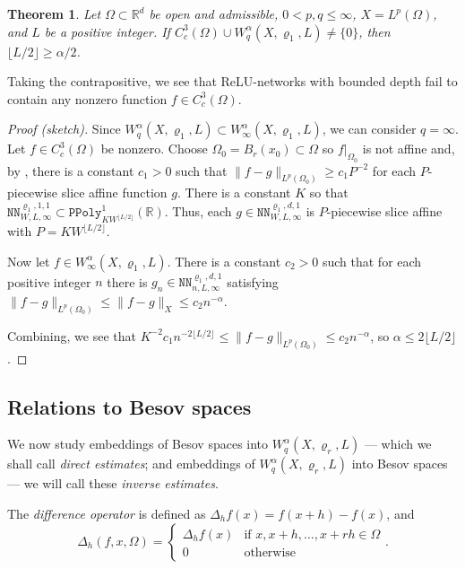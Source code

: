 \documentclass{article}
\newtheorem{theorem}{Theorem}[section]
\theoremstyle{definition}
\theoremstyle{remark}
\begin{document}
\begin{theorem}
    Let $\Omega \subset \mathbb{R}^d$ be open and admissible, $0 < p,q \leq \infty$, $X = L^p(\Omega)$, and $L$ be a positive integer. If $C_c^3(\Omega) \cup W_q^\alpha(X,\varrho_1,L) \neq \{ 0 \}$, then $\lfloor L/2 \rfloor \geq \alpha/2$.
\end{theorem}

Taking the contrapositive, we see that ReLU-networks with bounded depth fail to contain any nonzero function $f \in C_c^3(\Omega)$.

\begin{proof}[Proof (sketch)]
    Since $W_q^\alpha(X,\varrho_1,L) \subset W_\infty^\alpha(X,\varrho_1,L)$, we can consider $q = \infty$. Let $f \in C_c^3(\Omega)$ be nonzero. Choose $\Omega_0 = B_r(x_0) \subset \Omega$ so $f|_{\Omega_0}$ is not affine and, by \cite[Proposition C.5]{petersen_optimal_2018}, there is a constant $c_1 > 0$ such that $\lVert f-g \rVert_{L^p(\Omega_0)} \geq c_1P^{-2}$ for each $P$-piecewise slice affine function $g$. There is a constant $K$ so that $\mathtt{NN}_{W,L,\infty}^{\varrho_1,1,1} \subset \mathtt{PPoly}_{KW^{\lfloor L/2 \rfloor}}^1(\mathbb{R})$. Thus, each $g \in\mathtt{NN}_{W,L,\infty}^{\varrho_1,d,1}$ is $P$-piecewise slice affine with $P = KW^{\lfloor L/2 \rfloor}$.

    Now let $f \in W_\infty^\alpha(X,\varrho_1,L)$. There is a constant $c_2 > 0$ such that for each positive integer $n$ there is $g_n \in \mathtt{NN}_{n,L,\infty}^{\varrho_1,d,1}$ satisfying $\lVert f-g \rVert_{L^p(\Omega_0)} \leq \lVert f-g \rVert_X \leq c_2n^{-\alpha}$.

    Combining, we see that $K^{-2}c_1n^{-2\lfloor L/2 \rfloor} \leq \lVert f-g \rVert_{L^p(\Omega_0)} \leq c_2n^{-\alpha}$, so $\alpha \leq 2\lfloor L/2 \rfloor$.
\end{proof}


\subsection{Relations to Besov spaces}
We now study embeddings of Besov spaces into $W_q^\alpha(X,\varrho_r,L)$ --- which we shall call \textit{direct estimates}; and embeddings of $W_q^\alpha(X,\varrho_r,L)$ into Besov spaces --- we will call these \textit{inverse estimates}.

The \textit{difference operator} is defined as $\Delta_hf(x) = f(x+h)-f(x)$, and
\[\Delta_h(f,x,\Omega) =
\begin{cases}
    \Delta_hf(x) & \text{if }x,x+h,\ldots,x+rh \in \Omega \\
    0 & \text{otherwise}
\end{cases}.\]
\end{document}
